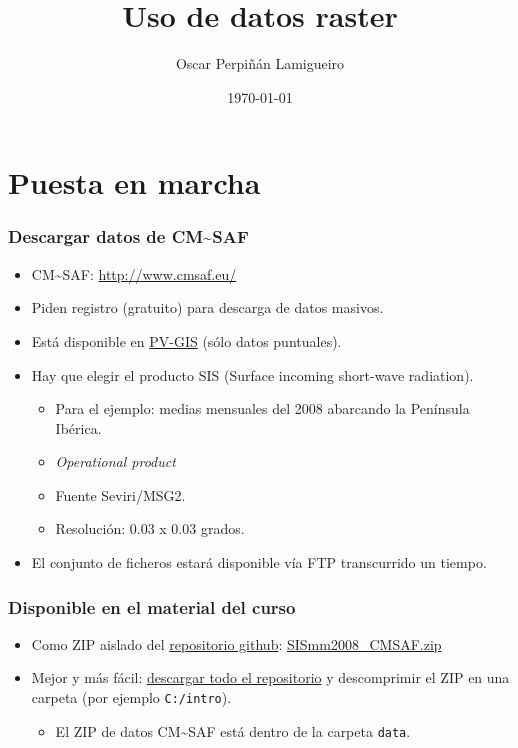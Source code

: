 \documentclass[xcolor={usenames,svgnames,dvipsnames}]{beamer}
\title{Uso de datos raster}
\author{Oscar Perpiñán Lamigueiro}
\date{\today}
\begin{document}
\maketitle


\section{Puesta en marcha}
\label{sec-1}
\begin{frame}
\frametitle{Descargar datos de CM\~{}SAF}
\label{sec-1-1}

\begin{itemize}
\item CM\~{}SAF: \href{http://www.cmsaf.eu/}{http://www.cmsaf.eu/}
\item Piden registro (gratuito) para descarga de datos masivos.
\item Está disponible en \href{http://re.jrc.ec.europa.eu/pvgis/apps4/pvest.php}{PV-GIS} (sólo datos puntuales).
\item Hay que elegir el producto SIS (Surface incoming short-wave radiation).
\begin{itemize}
\item Para el ejemplo: medias mensuales del 2008 abarcando la Península Ibérica.
\item \emph{Operational product}
\item Fuente Seviri/MSG2.
\item Resolución: 0.03 x 0.03 grados.
\end{itemize}
\item El conjunto de ficheros estará disponible vía FTP transcurrido un tiempo.
\end{itemize}
\end{frame}
\begin{frame}
\frametitle{Disponible en el material del curso}
\label{sec-1-2}

\begin{itemize}
\item Como ZIP aislado del \href{https://github.com/oscarperpinan/intro}{repositorio github}: \href{https://github.com/oscarperpinan/intro/blob/master/data/SISmm2008_CMSAF.zip?raw=true}{SISmm2008\_CMSAF.zip}
\item Mejor y más fácil: \href{https://github.com/oscarperpinan/intro/archive/master.zip}{descargar todo el repositorio} y descomprimir el ZIP en una carpeta (por ejemplo \texttt{C:/intro}).
\begin{itemize}
\item El ZIP de datos CM\~{}SAF está dentro de la carpeta \texttt{data}.
\end{itemize}
\end{itemize}
\end{frame}
\end{document}
